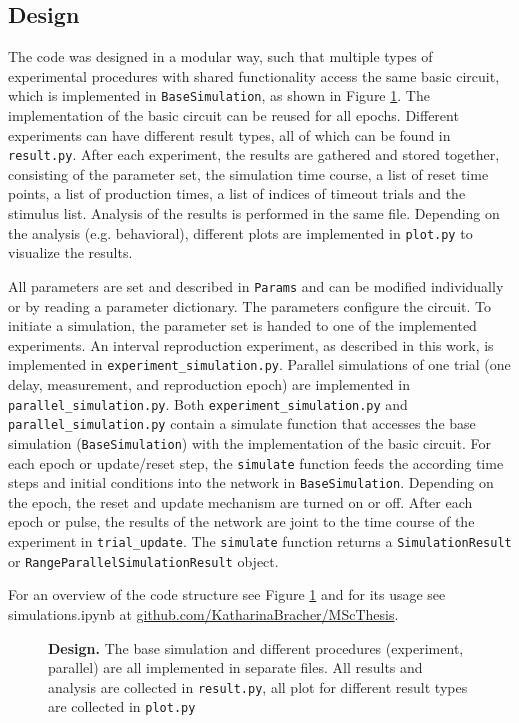\documentclass[10pt, a4paper]{article}
\begin{document}
\subsection*{Design}
The code was designed in a modular way, such that multiple types of experimental procedures with shared functionality access the same basic circuit, which is implemented in \texttt{BaseSimulation}, as shown in Figure \ref{fig:code}.
The implementation of the basic circuit can be reused for all epochs.
Different experiments can have different result types, all of which can be found in \texttt{result.py}. After each experiment, the results are gathered and stored together, consisting of the parameter set, the simulation time course, a list of reset time points, a list of production times, a list of indices of timeout trials and the stimulus list.
Analysis of the results is performed in the same file. Depending on the analysis (e.g. behavioral), different plots are implemented in \texttt{plot.py} to visualize the results. 

All parameters are set and described in \texttt{Params} and can be modified individually or by reading a parameter dictionary. The parameters configure the circuit. 
To initiate a simulation, the parameter set is handed to one of the implemented experiments. 
An interval reproduction experiment, as described in this work, is implemented in \texttt{experiment\_simulation.py}. 
Parallel simulations of one trial (one delay, measurement, and reproduction epoch) are implemented in \texttt{parallel\_simulation.py}.
Both \texttt{experiment\_simulation.py} and \texttt{parallel\_simulation.py} contain a simulate function that accesses the base simulation (\texttt{BaseSimulation}) with the implementation of the basic circuit.
For each epoch or update/reset step, the \texttt{simulate} function feeds the according time steps and initial conditions into the network in \texttt{BaseSimulation}. Depending on the epoch, the reset and update mechanism are turned on or off. 
After each epoch or pulse, the results of the network are joint to the time course of the experiment in \texttt{trial\_update}. The \texttt{simulate} function returns a \texttt{SimulationResult} or \texttt{RangeParallelSimulationResult} object.

For an overview of the code structure see Figure \ref{fig:code} and for its usage see simulations.ipynb at \href{https://github.com/KatharinaBracher/MScThesis}{github.com/KatharinaBracher/MScThesis}.


\begin{figure}[ht]
	\vspace*{-2cm}
	\caption{\textbf{Design.} The base simulation and different procedures (experiment, parallel) are all implemented in separate files. All results and analysis are collected in \texttt{result.py}, all plot for different result types are collected in \texttt{plot.py}}
\label{fig:code}
\end{figure}


\clearpage
{}
\printbibliography

%

\end{document}
